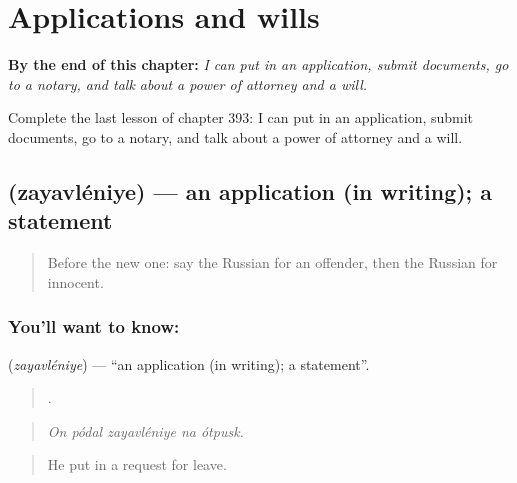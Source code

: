 
\chapter{Applications and wills}
\label{ch:ru-applications-and-wills}

\begin{chapteropening}
\textbf{By the end of this chapter:} \emph{I can put in an application, submit documents, go to a notary, and talk about a power of attorney and a will.}

Complete the last lesson of chapter 393: I can put in an application, submit documents, go to a notary, and talk about a power of attorney and a will.
\end{chapteropening}

\section[\texorpdfstring{\ru{заявление} (zayavléniye)}{заявление (zayavléniye)}]{ (zayavléniye) — an application (in writing); a statement}

\label{lesson:RU-C393-zayavlenie}



\begin{quote}
Before the new one: say the Russian for an offender, then the Russian for innocent.
\end{quote}

\subsection*{You'll want to know: }
\textbf{} (\emph{zayavléniye}) — \textquotedblleft{}an application (in writing); a statement\textquotedblright{}.

\begin{quote}
    .
\end{quote}

\begin{quote}
\emph{On pódal zayavléniye na ótpusk.}
\end{quote}

\begin{quote}
He put in a request for leave.
\end{quote}

